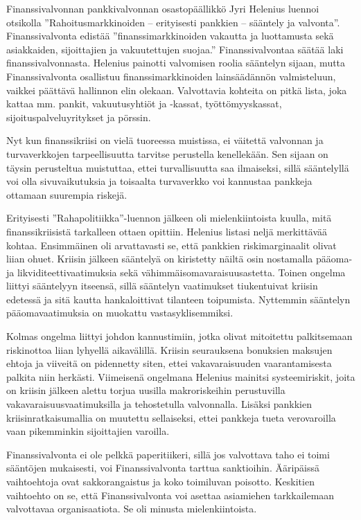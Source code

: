 \documentclass[12pt]{article}
\begin{document}
Finanssivalvonnan pankkivalvonnan osastopäällikkö Jyri Helenius luennoi
otsikolla ''Rahoitusmarkkinoiden -- erityisesti pankkien -- sääntely ja
valvonta''. Finanssivalvonta edistää ''finanssimarkkinoiden vakautta ja
luottamusta sekä asiakkaiden, sijoittajien ja vakuutettujen suojaa.''
Finanssivalvontaa säätää laki finanssivalvonnasta. Helenius painotti valvomisen
roolia sääntelyn sijaan, mutta Finanssivalvonta osallistuu finanssimarkkinoiden
lainsäädännön valmisteluun, vaikkei päättävä hallinnon elin olekaan.
Valvottavia kohteita on pitkä lista, joka kattaa mm. pankit, vakuutusyhtiöt ja
-kassat, työttömyyskassat, sijoituspalveluyritykset ja pörssin.

Nyt kun finanssikriisi on vielä tuoreessa muistissa, ei väitettä valvonnan ja
turvaverkkojen tarpeellisuutta tarvitse perustella kenellekään. Sen sijaan on
täysin perusteltua muistuttaa, ettei turvallisuutta saa ilmaiseksi, sillä
sääntelyllä voi olla sivuvaikutuksia ja toisaalta turvaverkko voi kannustaa
pankkeja ottamaan suurempia riskejä.

Erityisesti ''Rahapolitiikka''-luennon jälkeen oli mielenkiintoista kuulla,
mitä finanssikriisistä tarkalleen ottaen opittiin. Helenius listasi neljä
merkittävää kohtaa. Ensimmäinen oli arvattavasti se, että pankkien
riskimarginaalit olivat liian ohuet. Kriisin jälkeen sääntelyä on kiristetty
näiltä osin nostamalla pääoma- ja likviditeettivaatimuksia sekä
vä\-him\-mäis\-oma\-va\-rai\-suus\-as\-tet\-ta. Toinen ongelma liittyi
sääntelyyn itseensä, sillä sääntelyn vaatimukset tiukentuivat kriisin edetessä
ja sitä kautta hankaloittivat tilanteen toipumista. Nyttemmin sääntelyn
pääomavaatimuksia on muokattu vastasyklisemmiksi.

Kolmas ongelma liittyi johdon kannustimiin, jotka olivat mitoitettu
palkitsemaan riskinottoa liian lyhyellä aikavälillä. Kriisin seurauksena
bonuksien maksujen ehtoja ja viiveitä on pidennetty siten, ettei
vakavaraisuuden vaarantamisesta palkita niin herkästi. Viimeisenä ongelmana
Helenius mainitsi systeemiriskit, joita on kriisin jälkeen alettu torjua
uusilla makroriskeihin perustuvilla vakavaraisuusvaatimuksilla ja tehostetulla
valvonnalla. Lisäksi pankkien kriisinratkaisumallia on muutettu sellaiseksi,
ettei pankkeja tueta verovaroilla vaan pikemminkin sijoittajien varoilla.

Finanssivalvonta ei ole pelkkä paperitiikeri, sillä jos valvottava taho ei
toimi sääntöjen mukaisesti, voi Finanssivalvonta tarttua sanktioihin.
Ääripäissä vaihtoehtoja ovat sakkorangaistus ja koko toimiluvan poisotto.
Keskitien vaihtoehto on se, että Finanssivalvonta voi asettaa asiamiehen
tarkkailemaan valvottavaa organisaatiota. Se oli minusta mielenkiintoista.
\end{document}
